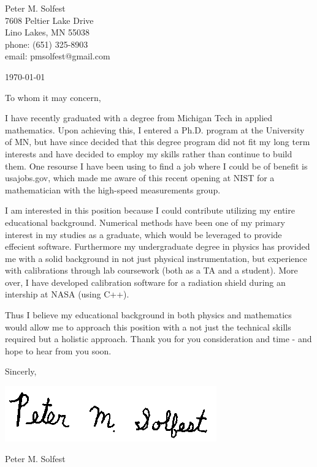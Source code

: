 \documentclass[letterpaper,12pt]{article}
\begin{document}
Peter M. Solfest\\
7608 Peltier Lake Drive\\
Lino Lakes, MN 55038\\
phone: (651) 325-8903\\
email: pmsolfest@gmail.com

\today


To whom it may concern, %

I have recently graduated with a degree from Michigan Tech in applied mathematics.
Upon achieving this, I entered a Ph.D. program at the University of MN, but have since
decided that this degree program did not fit my long term interests and have decided to
employ my skills rather than continue to build them.
One resourse I have been using to find a job where I could be of benefit is usajobs.gov,
which made me aware of this recent opening at NIST for a mathematician with the high-speed
measurements group.

I am interested in this position because I could contribute utilizing my entire educational background.
Numerical methods have been one of my primary interest in my studies as a graduate,
which would be leveraged to provide effecient software.
Furthermore my undergraduate degree in physics has provided me with a solid background
in not just physical instrumentation, but experience with calibrations through lab coursework
(both as a TA and a student).
More over, I have developed calibration software for a radiation shield during an intership at NASA (using C++).


Thus I believe my educational background in both physics and mathematics would allow me to approach 
this position with a not just the technical skills required but a holistic approach.
Thank you for you consideration and time - and hope to hear from you soon.

Sincerly,

\includegraphics[height=.5in]{signature.png}

Peter M. Solfest
\end{document}
